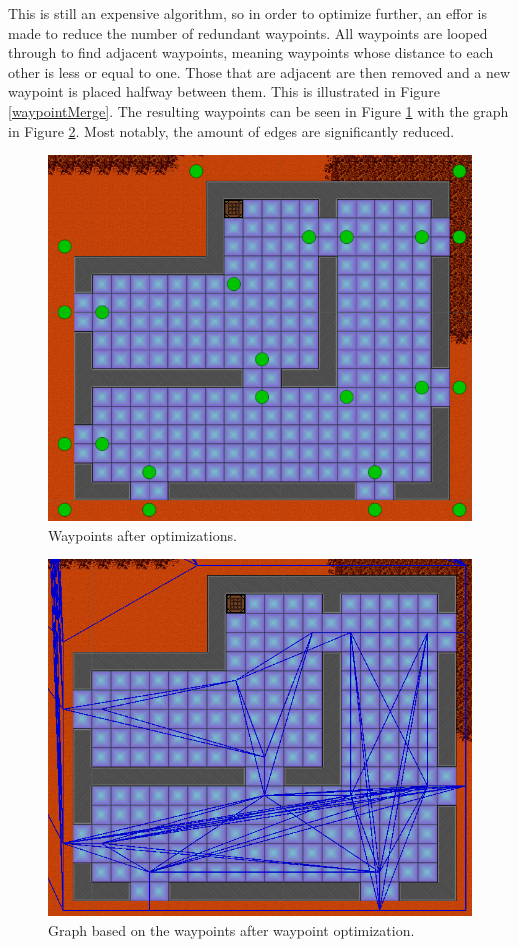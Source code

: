 This is still an expensive algorithm, so in order to optimize further, an effor is made to reduce the number of redundant waypoints.
All waypoints are looped through to find adjacent waypoints, meaning waypoints whose distance to each other is less or equal to one.
Those that are adjacent are then removed and a new waypoint is placed halfway between them.
This is illustrated in Figure \ref{waypointMerge}.
The resulting waypoints can be seen in Figure \ref{waypointOpt} with the graph in Figure \ref{waypointgraphOpt}.
Most notably, the amount of edges are significantly reduced.

\begin{figure}[H]
	\includegraphics[width=\textwidth]{figures/astar/optimizedWaypoints}
	\caption{Waypoints after optimizations.}
	\label{waypointOpt}
\end{figure}

\begin{figure}[H]
	\includegraphics[width=\textwidth]{figures/astar/optimizedWaypointsGraph}
	\caption{Graph based on the waypoints after waypoint optimization.}
	\label{waypointgraphOpt}
\end{figure}


